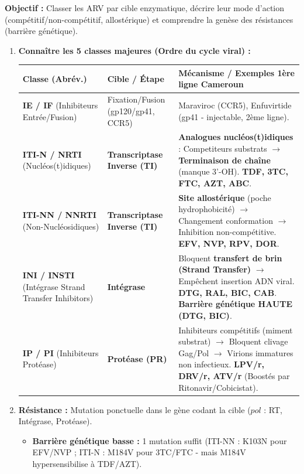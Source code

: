 \documentclass[11pt]{article}
\begin{document}
\begin{methode}
\textbf{Objectif :} Classer les ARV par cible enzymatique, décrire leur mode d'action (compétitif/non-compétitif, allostérique) et comprendre la genèse des résistances (barrière génétique).
\begin{enumerate}
    \item \textbf{Connaître les 5 classes majeures (Ordre du cycle viral) :}
    \begin{center}
    \begin{tabularx}{\linewidth}{|l|l|X|}\hline
    \rowcolor{popblueL} \textbf{Classe (Abrév.)} & \textbf{Cible / Étape} & \textbf{Mécanisme / Exemples 1ère ligne Cameroun} \\ \hline
    \textbf{IE / IF} (Inhibiteurs Entrée/Fusion) & Fixation/Fusion (gp120/gp41, CCR5) & Maraviroc (CCR5), Enfuvirtide (gp41 - injectable, 2ème ligne). \\ \hline
    \textbf{ITI-N / NRTI} (Nucléos(t)idiques) & \textbf{Transcriptase Inverse (TI)} & \textbf{Analogues nucléos(t)idiques} : Competiteurs substrats $\rightarrow$ \textbf{Terminaison de chaîne} (manque 3'-OH). \textbf{TDF, 3TC, FTC, AZT, ABC}. \\ \hline
    \textbf{ITI-NN / NNRTI} (Non-Nucléosidiques) & \textbf{Transcriptase Inverse (TI)} & \textbf{Site allostérique} (poche hydrophobicité) $\rightarrow$ Changement conformation $\rightarrow$ Inhibition non-compétitive. \textbf{EFV, NVP, RPV, DOR}. \\ \hline
    \textbf{INI / INSTI} (Intégrase Strand Transfer Inhibitors) & \textbf{Intégrase} & Bloquent \textbf{transfert de brin (Strand Transfer)} $\rightarrow$ Empêchent insertion ADN viral. \textbf{DTG, RAL, BIC, CAB}. \textbf{Barrière génétique HAUTE (DTG, BIC)}. \\ \hline
    \textbf{IP / PI} (Inhibiteurs Protéase) & \textbf{Protéase (PR)} & Inhibiteurs compétitifs (miment substrat) $\rightarrow$ Bloquent clivage Gag/Pol $\rightarrow$ Virions immatures non infectieux. \textbf{LPV/r, DRV/r, ATV/r} (Boostés par Ritonavir/Cobicistat). \\ \hline
    \end{tabularx}
    \end{center}
    \item \textbf{Résistance :} Mutation ponctuelle dans le gène codant la cible ($pol$ : RT, Intégrase, Protéase).
    \begin{itemize}
        \item \textbf{Barrière génétique basse :} 1 mutation suffit (ITI-NN : K103N pour EFV/NVP ; ITI-N : M184V pour 3TC/FTC - mais M184V hypersensibilise à TDF/AZT).

\end{itemize}
\end{enumerate}
\end{methode}
\end{document}
